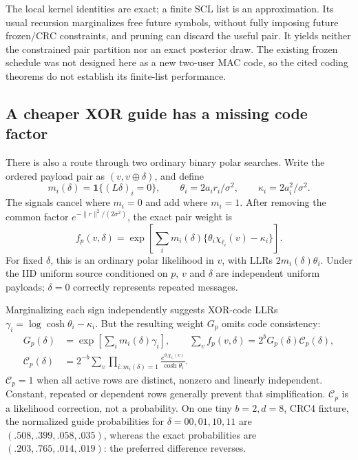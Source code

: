 \documentclass[10pt,a4paper]{article}
\newcommand{\ind}{\mathbf 1}
\begin{document}
The local kernel identities are exact; a finite SCL list is an approximation. Its usual recursion
marginalizes free future symbols, without fully imposing future frozen/CRC constraints, and pruning
can discard the useful pair. It yields neither the constrained pair partition nor an exact posterior
draw. The existing frozen schedule was not designed here as a new two-user MAC code, so the cited
coding theorems do not establish its finite-list performance.

\subsection{A cheaper XOR guide has a missing code factor}
There is also a route through two ordinary binary polar searches. Write the ordered payload pair as
$(v,v\oplus\delta)$, and define
\[
 m_i(\delta)=\ind\{(L\delta)_i=0\},\qquad
 \theta_i=2a_ir_i/\sigma^2,\qquad \kappa_i=2a_i^2/\sigma^2.
\]
The signals cancel where $m_i=0$ and add where $m_i=1$. After removing the common factor
$e^{-\|r\|^2/(2\sigma^2)}$, the exact pair weight is
\begin{equation}
 f_p(v,\delta)=\exp\!\left[\sum_i m_i(\delta)
              \{\theta_i\chi_{\ell_i}(v)-\kappa_i\}\right].
 \label{eq:pairxorweight}
\end{equation}
For fixed $\delta$, this is an ordinary polar likelihood in $v$, with LLRs $2m_i(\delta)\theta_i$.
Under the IID uniform source conditioned on $p$, $v$ and $\delta$ are independent uniform payloads;
$\delta=0$ correctly represents repeated messages.

Marginalizing each sign independently suggests XOR-code LLRs
$\gamma_i=\log\cosh\theta_i-\kappa_i$. But the resulting weight $G_p$ omits code consistency:
\begin{align}
 G_p(\delta)&=\exp\!\left[\sum_i m_i(\delta)\gamma_i\right],\qquad
 \sum_v f_p(v,\delta)=2^bG_p(\delta)\mathcal C_p(\delta),\label{eq:xorcorrection}\\
 \mathcal C_p(\delta)&=2^{-b}\sum_v\prod_{i:m_i(\delta)=1}
       \frac{e^{\theta_i\chi_{\ell_i}(v)}}{\cosh\theta_i}.\nonumber
\end{align}
$\mathcal C_p=1$ when all active rows are distinct, nonzero and linearly independent. Constant, repeated or
dependent rows generally prevent that simplification. $\mathcal C_p$ is a likelihood correction, not a
probability. On one tiny $b=2,d=8$, CRC4 fixture, the normalized guide probabilities for
$\delta=00,01,10,11$ are $(.508,.399,.058,.035)$, whereas the exact probabilities are
$(.203,.765,.014,.019)$: the preferred difference reverses.
\end{document}
